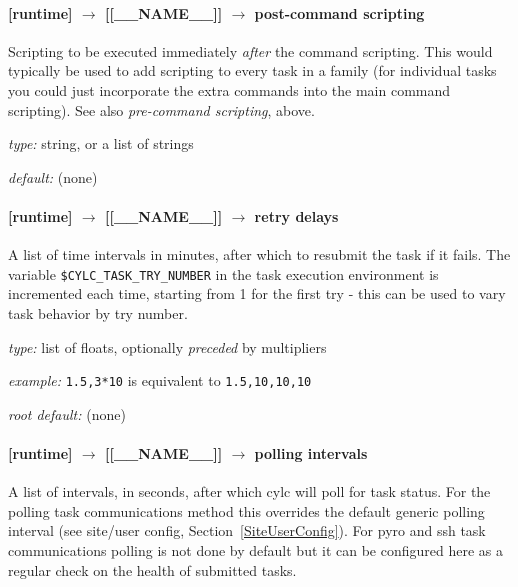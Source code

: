 \paragraph[post-command scripting]{ [runtime] $\rightarrow$ [[\_\_NAME\_\_]] $\rightarrow$ post-command scripting}

Scripting to be executed immediately {\em after} the command scripting.
This would typically be used to add scripting to every task in a family
(for individual tasks you could just incorporate the extra commands into
the main command scripting). See also {\em pre-command scripting},
above.

\begin{myitemize}
\item {\em type:} string, or a list of strings
\item {\em default:} (none)
\end{myitemize}

\paragraph[retry delays]{[runtime] $\rightarrow$ [[\_\_NAME\_\_]] $\rightarrow$ retry delays}
\label{RefRetries}

A list of time intervals in minutes, after which to resubmit the task if
it fails. The variable \lstinline=$CYLC_TASK_TRY_NUMBER= in the task
execution environment is incremented each time, starting from 1 for the
first try - this can be used to vary task behavior by try number. 

\begin{myitemize}
\item {\em type:} list of floats, optionally {\em preceded} by multipliers
\item {\em example:} \lstinline=1.5,3*10= is equivalent to \lstinline=1.5,10,10,10=
\item {\em root default:} (none)
\end{myitemize}

\paragraph[polling intervals]{[runtime] $\rightarrow$ [[\_\_NAME\_\_]] $\rightarrow$ polling intervals}
\label{PollingIntervals}

A list of intervals, in seconds, after which cylc will poll for task
status. For the polling task communications method this overrides the
default generic polling interval (see site/user config,
Section~\ref{SiteUserConfig}). For pyro and ssh task communications
polling is not done by default but it can be configured here as a
regular check on the health of submitted tasks.

